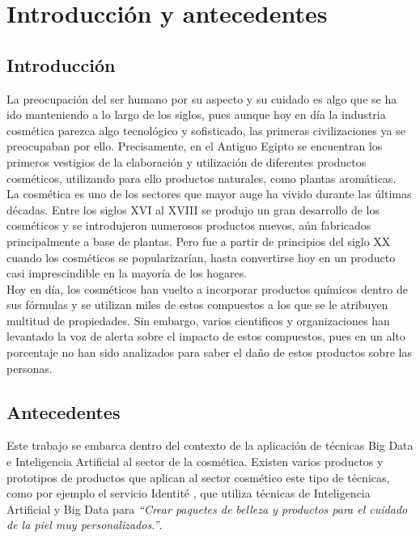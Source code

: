 
\chapter{Introducción y antecedentes} %
\label{chap:introduction} %

\section{Introducción}

La preocupación del ser humano por su aspecto y su cuidado es algo que se ha ido manteniendo a lo largo de los siglos, pues aunque hoy en día la industria cosmética parezca algo tecnológico y sofisticado, las primeras civilizaciones ya se preocupaban por ello. Precisamente, en el Antiguo Egipto se encuentran los primeros vestigios de la elaboración y utilización de diferentes productos cosméticos, utilizando para ello productos naturales, como plantas aromáticas. \\

La cosmética es uno de los sectores que mayor auge ha vivido durante las últimas décadas. Entre los siglos XVI al XVIII se produjo un gran desarrollo de los cosméticos y se introdujeron numerosos productos nuevos, aún fabricados principalmente a base de plantas. Pero fue a partir de principios del siglo XX cuando los cosméticos se popularizarían, hasta convertirse hoy en un producto casi imprescindible en la mayoría de los hogares. \\

Hoy en día, los cosméticos han vuelto a incorporar productos químicos dentro de sus fórmulas y se utilizan miles de estos compuestos a los que se le atribuyen multitud de propiedades. Sin embargo, varios cientificos y organizaciones han levantado la voz de alerta sobre el impacto de estos compuestos, pues en un alto porcentaje no han sido analizados para saber el daño de estos productos sobre las personas.



\section{Antecedentes}

Este trabajo se embarca dentro del contexto de la aplicación de técnicas Big Data e Inteligencia Artificial al sector de la cosmética. Existen varios productos y prototipos de productos que aplican al sector cosmético este tipo de técnicas, como por ejemplo el servicio Identité \citep{identite}, que utiliza técnicas de Inteligencia Artificial y Big Data para \textit{``Crear paquetes de belleza y productos para el cuidado de la piel muy personalizados.''}. 





